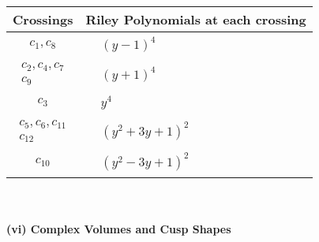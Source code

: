 \documentclass[1p]{elsarticle_modified}
\theoremstyle{definition}
\begin{document}
\begin{tabular}{m{50pt}|m{274pt}}
Crossings & \hspace{64pt}Riley Polynomials at each crossing \\
\hline $$\begin{aligned}c_{1},c_{8}\end{aligned}$$&$\begin{aligned}
&(y-1)^4
\end{aligned}$\\
\hline $$\begin{aligned}c_{2},c_{4},c_{7}\\c_{9}\end{aligned}$$&$\begin{aligned}
&(y+1)^4
\end{aligned}$\\
\hline $$\begin{aligned}c_{3}\end{aligned}$$&$\begin{aligned}
&y^4
\end{aligned}$\\
\hline $$\begin{aligned}c_{5},c_{6},c_{11}\\c_{12}\end{aligned}$$&$\begin{aligned}
&(y^2+3 y+1)^2
\end{aligned}$\\
\hline $$\begin{aligned}c_{10}\end{aligned}$$&$\begin{aligned}
&(y^2-3 y+1)^2
\end{aligned}$\\
\hline
\end{tabular}\\~\\
\newpage\flushleft \textbf{(vi) Complex Volumes and Cusp Shapes}
\end{document}
